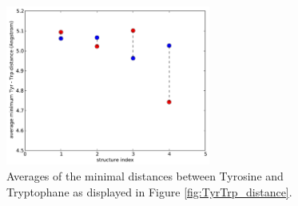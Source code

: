 \documentclass[english, a4paper, 12pt, titlepage, draft]{article}
\begin{document}
\begin{figure}
    \centering
    \includegraphics[width=0.6\textwidth]{figures/TyrTrp/average_mindist_TyrTrp.pdf}
    \caption{Averages of the minimal distances between Tyrosine and Tryptophane as displayed in Figure \ref{fig:TyrTrp_distance}.}
    \label{fig:TyrTrp_average}
\end{figure}         



          
\end{document}
